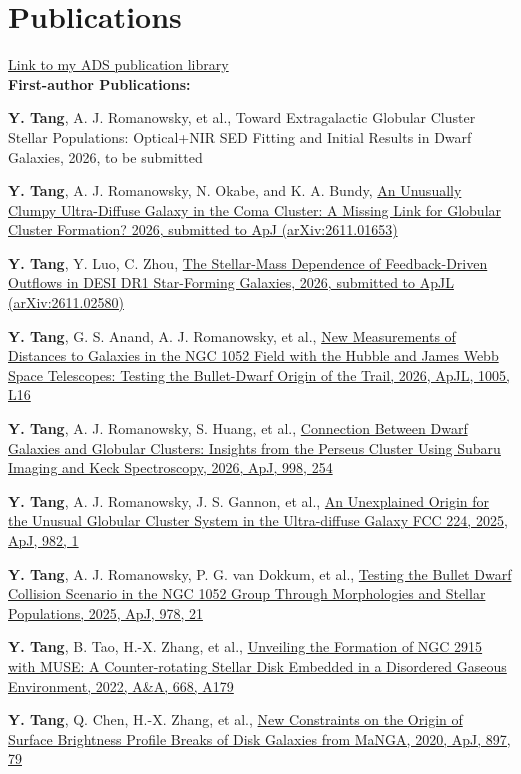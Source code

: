 \documentclass[letterpaper,11pt]{article}
\begin{document}
\section{Publications}
\href{https://ui.adsabs.harvard.edu/public-libraries/wkkyIxzqSveeiQVd0Qn-HQ}{Link to my ADS publication library}\\
\vspace{0.1cm}
{\bf First-author Publications:}
\vspace{-0.15cm}
\begin{etaremune}[itemsep=-2pt]
\item {\bf Y. Tang}, A. J. Romanowsky, et al., {Toward Extragalactic Globular Cluster Stellar Populations: Optical+NIR SED Fitting and Initial Results in Dwarf Galaxies, 2026, to be submitted}
\item {\bf Y. Tang}, A. J. Romanowsky, N. Okabe, and K. A. Bundy, \href{https://arxiv.org/abs/2611.01653}{An Unusually Clumpy Ultra-Diffuse Galaxy in the Coma Cluster: A Missing Link for Globular Cluster Formation? 2026, submitted to ApJ (arXiv:2611.01653)}
\item {\bf Y. Tang}, Y. Luo, C. Zhou, \href{https://arxiv.org/abs/2611.02580}{The Stellar-Mass Dependence of Feedback-Driven Outflows in DESI DR1 Star-Forming Galaxies, 2026, submitted to ApJL (arXiv:2611.02580)}
\item {\bf Y. Tang}, G. S. Anand, A. J. Romanowsky, et al., \href{https://ui.adsabs.harvard.edu/abs/2026ApJ..1005L..16T/abstract}{New Measurements of Distances to Galaxies in the NGC 1052 Field with the Hubble and James Webb Space Telescopes: Testing the Bullet-Dwarf Origin of the Trail, 2026, ApJL, 1005, L16}
\item {\bf Y. Tang}, A. J. Romanowsky, S. Huang, et al., \href{https://ui.adsabs.harvard.edu/abs/2026ApJ...998..254T/abstract}{Connection Between Dwarf Galaxies and Globular Clusters: Insights from the Perseus Cluster Using Subaru Imaging and Keck Spectroscopy, 2026, ApJ, 998, 254}
\item {\bf Y. Tang}, A. J. Romanowsky, J. S. Gannon, et al., \href{https://ui.adsabs.harvard.edu/abs/2025ApJ...982....1T/abstract}{An Unexplained Origin for the Unusual Globular Cluster System in the Ultra-diffuse Galaxy FCC 224, 2025, ApJ, 982, 1}
\item {\bf Y. Tang}, A. J. Romanowsky, P. G. van Dokkum, et al., \href{https://ui.adsabs.harvard.edu/abs/2025ApJ...978...21T/abstract}{Testing the Bullet Dwarf Collision Scenario in the NGC 1052 Group Through Morphologies and Stellar Populations, 2025, ApJ, 978, 21}
\item {\bf Y. Tang}, B. Tao, H.-X. Zhang, et al., \href{https://ui.adsabs.harvard.edu/abs/2022A%26A...668A.179T/abstract}{Unveiling the Formation of NGC 2915 with MUSE: A Counter-rotating Stellar Disk Embedded in a Disordered Gaseous Environment, 2022, A\&A, 668, A179}
\item {\bf Y. Tang}, Q. Chen, H.-X. Zhang, et al., \href{https://ui.adsabs.harvard.edu/abs/2020ApJ...897...79T/abstract}{New Constraints on the Origin of Surface Brightness Profile Breaks of Disk Galaxies from MaNGA, 2020, ApJ, 897, 79}
\end{etaremune}
\end{document}

